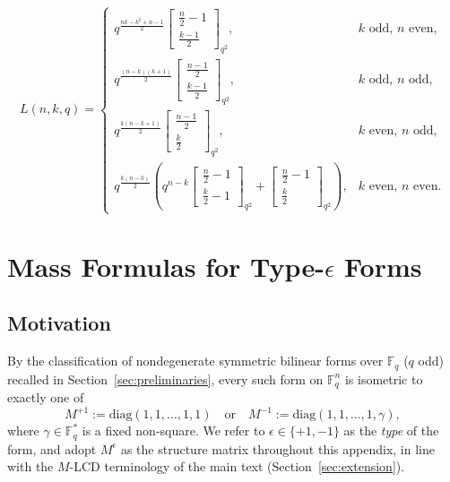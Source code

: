 \documentclass[11pt]{article}
\newcommand{\FF}{\mathbb{F}}
\newcommand{\0}{\mathbf{0}}
\newcommand{\1}{\mathbf{1}}
\theoremstyle{plain}
\theoremstyle{definition}
\theoremstyle{remark}
\begin{document}
$$
L(n,k,q) = \begin{cases}
q^{\frac{nk-k^2+n-1}{2}} \left[\begin{smallmatrix} \frac{n}{2}-1 \\ \frac{k-1}{2} \end{smallmatrix}\right]_{q^2}, & k \text{ odd, } n \text{ even,} \\[6pt]
q^{\frac{(n-k)(k+1)}{2}} \left[\begin{smallmatrix} \frac{n-1}{2} \\ \frac{k-1}{2} \end{smallmatrix}\right]_{q^2}, & k \text{ odd, } n \text{ odd,} \\[6pt]
q^{\frac{k(n-k+1)}{2}} \left[\begin{smallmatrix} \frac{n-1}{2} \\ \frac{k}{2} \end{smallmatrix}\right]_{q^2}, & k \text{ even, } n \text{ odd,} \\[6pt]
q^{\frac{k(n-k)}{2}} \left( q^{n-k} \left[\begin{smallmatrix} \frac{n}{2}-1 \\ \frac{k}{2}-1 \end{smallmatrix}\right]_{q^2} + \left[\begin{smallmatrix} \frac{n}{2}-1 \\ \frac{k}{2} \end{smallmatrix}\right]_{q^2} \right), & k \text{ even, } n \text{ even.}
\end{cases}
$$
\section{Mass Formulas for Type-$\epsilon$ Forms}
\label{app:type_epsilon}

\subsection{Motivation}

By the classification of nondegenerate symmetric bilinear forms over $\FF_q$ ($q$ odd) recalled in Section~\ref{sec:preliminaries}, every such form on $\FF_q^n$ is isometric to exactly one of
\[
M^{+1} := \mathrm{diag}(1, 1, \ldots, 1, 1) \quad \text{or} \quad M^{-1} := \mathrm{diag}(1, 1, \ldots, 1, \gamma),
\]
where $\gamma \in \FF_q^*$ is a fixed non-square. We refer to $\epsilon \in \{+1, -1\}$ as the \emph{type} of the form, and adopt $M^\epsilon$ as the structure matrix throughout this appendix, in line with the $M$-LCD terminology of the main text (Section~\ref{sec:extension}).
\end{document}
